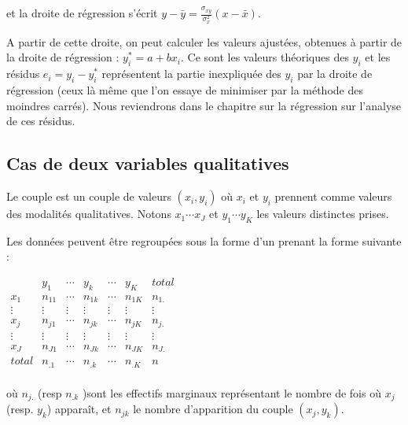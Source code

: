 \documentclass[letterpaper,10pt,french]{sphinxmanual}
\begin{document}
\sphinxAtStartPar
et la droite de régression s’écrit \(y-\bar{y}=\frac{\sigma_{xy}}{\sigma_x^2}\left ( x-\bar{x}\right )\).

\sphinxAtStartPar
A partir de cette droite, on peut calculer les valeurs ajustées, obtenues à partir de la droite de régression : \(y^*_i=a+bx_i\). Ce sont les valeurs théoriques des \(y_i\) et les résidus \(e_i=y_i-y_i^*\) représentent la partie inexpliquée des \(y_i\) par la droite de régression (ceux là même que l’on essaye de minimiser par la méthode des moindres carrés). Nous reviendrons dans le chapitre sur la régression sur l’analyse de ces résidus.


\subsection{Cas de deux variables qualitatives}
\label{\detokenize{statsdescriptives:cas-de-deux-variables-qualitatives}}
\sphinxAtStartPar
Le couple est un couple de valeurs \((x_i,y_i)\) où \(x_i\) et \(y_i\) prennent comme valeurs des modalités qualitatives. Notons \(x_1\cdots x_J\) et \(y_1\cdots y_K\) les valeurs distinctes prises.

\sphinxAtStartPar
Les données peuvent être regroupées sous la forme d’un  prenant la forme suivante :

\ignorespaces 
{}\ignorespaces 
\sphinxAtStartPar
\(\begin{array}{c|ccccc|c}
&y_1&\cdots&y_k&\cdots&y_K&total\\
\hline
x_1&n_{11}&\cdots&n_{1k}&\cdots&n_{1K}&n_{1.}\\
\vdots&\vdots&\vdots&\vdots&\vdots&\vdots&\vdots\\
x_j&n_{j1}&\cdots&n_{jk}&\cdots&n_{jK}&n_{j.}\\
\vdots&\vdots&\vdots&\vdots&\vdots&\vdots&\vdots\\
x_J&n_{J1}&\cdots&n_{Jk}&\cdots&n_{JK}&n_{J.}\\
\hline
total&n_{.1}&\cdots&n_{.k}&\cdots&n_{.K}&n\\
\end{array}
\)

\sphinxAtStartPar
où \(n_{j.}\) (resp \(n_{.k}\) )sont les effectifs marginaux représentant le nombre de fois où \(x_j\) (resp. \(y_k\)) apparaît, et \(n_{jk}\) le nombre d’apparition du couple \((x_j,y_k)\).
\end{document}
